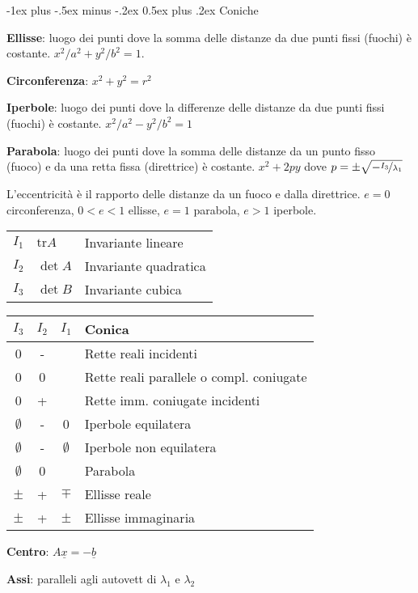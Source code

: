 \documentclass[10pt,landscape]{article}
\makeatletter
\renewcommand{\section}{\@startsection{section}{1}{0mm}%
                                {-1ex plus -.5ex minus -.2ex}%
                                {0.5ex plus .2ex}%
                                {\normalfont\large\bfseries}}
\renewcommand{\vec}[1]{\underline{#1}}
\newcommand{\tr}{\mathrm{tr}}
\makeatother
\begin{document}
\begin{multicols}{3}
\section{Coniche}

\textbf{Ellisse}: luogo dei punti dove la somma delle distanze da due punti fissi (fuochi) è costante. $x^2/a^2 + y^2/b^2 = 1$.

\textbf{Circonferenza}: $x^2+y^2=r^2$

\textbf{Iperbole}: luogo dei punti dove la differenze delle distanze da due punti fissi (fuochi) è costante. $x^2/a^2 - y^2/b^2 = 1$

\textbf{Parabola}: luogo dei punti dove la somma delle distanze da un punto fisso (fuoco) e da una retta fissa (direttrice) è costante. $x^2+2py$ dove $p=\pm \sqrt{-\nicefrac{I_3}{\lambda_1}}$

L'eccentricità è il rapporto delle distanze da un fuoco e dalla direttrice. $e = 0$ circonferenza, $0 < e < 1$ ellisse, $e = 1$ parabola, $e > 1$ iperbole. 

\begin{tabular}{lll}
	$I_1$ & $\tr A$ & Invariante lineare \\
	$I_2$ & $\det A$ & Invariante quadratica \\
	$I_3$ & $\det B$ & Invariante cubica
\end{tabular}

\begin{tabular}{c|c|c|l}
	\boldmath$I_3$ & \boldmath$I_2$ & \boldmath$I_1$ & \textbf{Conica} \\
	\hline
	0     & -     &       & Rette reali incidenti \\
	0     & 0     &       & Rette reali parallele o compl. coniugate \\
	0     & +     &       & Rette imm. coniugate incidenti \\
	\hline
	$\emptyset$ & -     & 0     & Iperbole equilatera \\
	$\emptyset$ & -     & $\emptyset$ & Iperbole non equilatera \\
	$\emptyset$ & 0     &       & Parabola \\
	$\pm$ & +     & $\mp$ & Ellisse reale \\
	$\pm$ & +     & $\pm$ & Ellisse immaginaria \\
	\hline
\end{tabular}

\textbf{Centro}: $A\vec{x} = -\vec{b}$

\textbf{Assi}: paralleli agli autovett di $\lambda_1$ e $\lambda_2$


\end{multicols}
\end{document}
